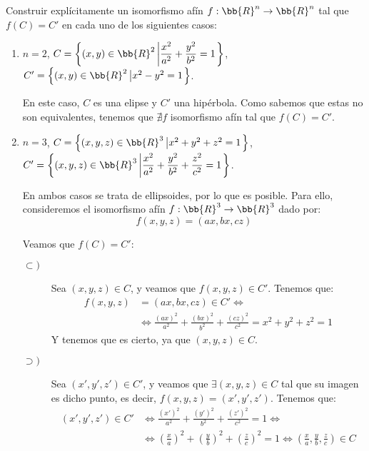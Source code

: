 


\begin{ejercicio}
    Construir explícitamente un isomorfismo afín $f : \bb{R}^n \to \bb{R}^n$ tal que $f(C) = C'$ en cada uno de los siguientes casos:
    \begin{enumerate}
        \item $n=2$, $C=\left\{(x,y)\in \bb{R}^2\left|\dfrac{x^2}{a^2} + \dfrac{y^2}{b^2}=1\right.\right\}$, $C'=\left\{(x,y)\in \bb{R}^2\left|x^2 - y^2=1\right.\right\}$.
        
        En este caso, $C$ es una elipse y $C'$ una hipérbola. Como sabemos que estas no son equivalentes, tenemos que $\nexists f$ isomorfismo afín tal que $f(C)=C'$.
        
        \item $n=3$, $C=\left\{(x,y,z)\in \bb{R}^3\left|x^2 + y^2+z^2=1\right.\right\}$, $C'=\left\{(x,y,z)\in \bb{R}^3\left|\dfrac{x^2}{a^2} + \dfrac{y^2}{b^2} + \dfrac{z^2}{c^2}=1\right.\right\}$.
        
        En ambos casos se trata de ellipsoides, por lo que es posible. Para ello, consideremos el isomorfismo afín $f:\bb{R}^3\to \bb{R}^3$ dado por:
        \begin{equation*}
            f(x,y,z) = \left(ax, bx, cz\right)
        \end{equation*}

        Veamos que $f(C)=C'$:
        \begin{description}
            \item[$\subset)$] Sea $(x,y,z)\in C$, y veamos que $f(x,y,z)\in C'$. Tenemos que:
            \begin{align*}
                f(x,y,z) &= \left(ax, bx, cz\right) \in C' \Longleftrightarrow \\ & \Longleftrightarrow
                 \frac{(ax)^2}{a^2} + \frac{(bx)^2}{b^2} + \frac{(cz)^2}{c^2} = x^2+y^2+z^2=1
            \end{align*}
            Y tenemos que es cierto, ya que $(x,y,z)\in C$.

            \item[$\supset)$] Sea $(x',y',z')\in C'$, y veamos que $\exists (x,y,z)\in C$ tal que su imagen es dicho punto, es decir, $f(x,y,z)=(x',y',z')$. Tenemos que:
            \begin{align*}
                (x',y',z')\in C' &\Longleftrightarrow
                \frac{(x')^2}{a^2} + \frac{(y')^2}{b^2} + \frac{(z')^2}{c^2} = 1 \Longleftrightarrow \\ & \Longleftrightarrow
                \left(\frac{x}{a}\right)^2 + \left(\frac{y}{b}\right)^2 + \left(\frac{z}{c}\right)^2 = 1 \Longleftrightarrow
                \left( \frac{x}{a}, \frac{y}{b}, \frac{z}{c} \right) \in C
            \end{align*}
        \end{description}


\end{enumerate}
\end{ejercicio}
